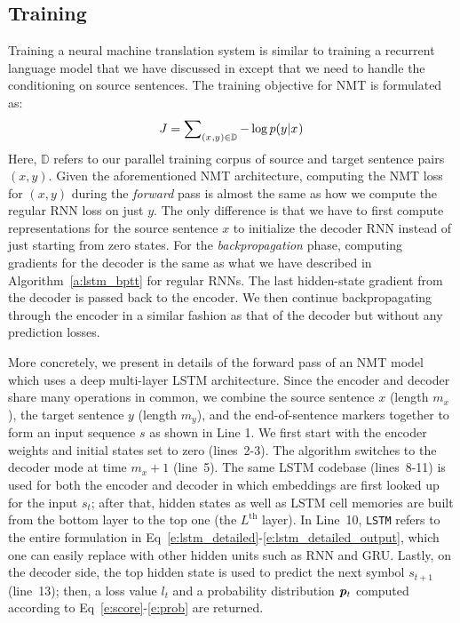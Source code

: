 \subsection{Training}
Training a neural machine translation system is similar to training a recurrent
language model that we have discussed in  except that we need to
handle the conditioning on source sentences.
The training objective for NMT is formulated as:
\begin{equation}
J = \sum_{(x_{},y_{}) \in \mathbb{D}} \nolimits -\log p(y_{}|x_{})
\label{e:j_t}
\end{equation}
Here, $\mathbb{D}$ refers to our parallel training corpus of source and target
sentence pairs $(x, y)$. Given the aforementioned NMT architecture,
computing the NMT loss for $(x, y)$ during the {\it forward} pass is
almost the same as how we compute the regular RNN loss on just $y$.
The only difference is that we have to first compute representations for the source
sentence $x$ to initialize the decoder RNN instead of just starting
from zero states. For the {\it backpropagation} phase, computing gradients for
the decoder is the same as what we have described in
Algorithm~\ref{a:lstm_bptt} for regular RNNs. The last hidden-state gradient
from the decoder is
passed back to the encoder. We then continue backpropagating through the encoder
in a similar fashion as that of the decoder but without any prediction losses.

More concretely, we present in
 details of the forward pass of an NMT model which uses
a deep multi-layer LSTM architecture. Since the encoder and decoder share
many operations in common, we combine the source sentence $x$ (length
$m_x$), the target sentence $y$ (length $m_y$), and the end-of-sentence markers
\word{\_} together to form an input sequence $s$ as shown in Line 1. We first start with the encoder weights and initial states
set to zero (lines~2-3). The algorithm switches to the decoder mode at time
$m_x + 1$ (line~5). The same LSTM codebase (lines~8-11) is used for both the
encoder and decoder in which embeddings are first looked up for the input
$s_t$; after that, hidden states as well as LSTM cell memories are built from the
bottom layer to the top one (the $L^{\text{th}}$ layer). 
In Line~10, \texttt{LSTM} refers
to the entire formulation in
Eq~\ref{e:lstm_detailed}-\ref{e:lstm_detailed_output}, which one can easily
replace with other hidden units such as RNN and GRU. Lastly, on the decoder
side, the top hidden state is used to predict the next symbol $s_{t+1}$
(line~13); then, a loss value $l_t$ and a probability distribution
$\bm{p}_{t}$ computed according to Eq~\ref{e:score}-\ref{e:prob} are returned.

